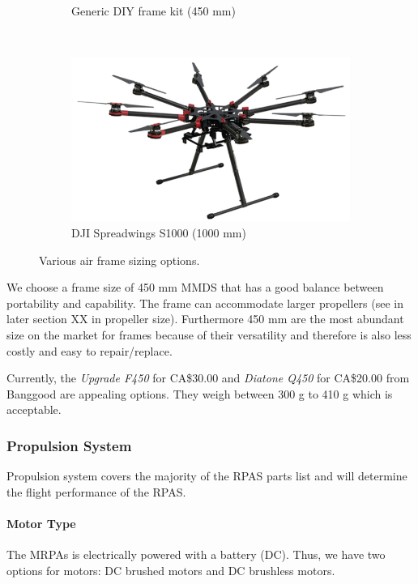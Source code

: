 \begin{figure}[H]
\begin{subfigure}[b]{0.33\textwidth}
        \caption{Generic DIY frame kit (450 mm)}
    \end{subfigure}
    ~
    \begin{subfigure}[b]{0.33\textwidth}
        \centering
        \includegraphics[width=\textwidth]{img/djis1000}
        \caption{DJI Spreadwings S1000 (1000 mm)}
    \end{subfigure}
    
    \caption{Various air frame sizing options. }
    \label{fig:}
\end{figure}

We choose a frame size of 450 mm MMDS that has a good balance between portability and capability. The frame 
can accommodate larger propellers (see in later section XX in propeller size). Furthermore 450 mm are the 
most abundant size on the market for frames because of their versatility and therefore is also less costly 
and easy to repair/replace.

Currently, the \textit{Upgrade F450} for CA\$30.00 and \textit{Diatone Q450} for CA\$20.00 from Banggood are appealing options. They weigh between 300 g to 410 g which is acceptable.

\subsubsection{Propulsion System}

Propulsion system covers the majority of the RPAS parts list and will determine the flight performance of the RPAS. 

\paragraph{Motor Type}

The MRPAs is electrically powered with a battery (DC). Thus, we have two options for motors: DC brushed 
motors and DC brushless motors.

